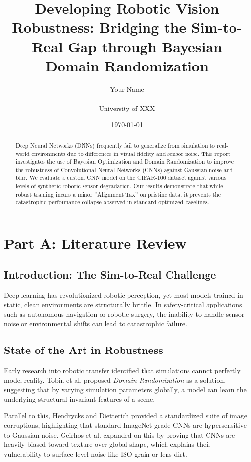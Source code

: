 \documentclass[11pt,a4paper]{article}
\title{Developing Robotic Vision Robustness: Bridging the Sim-to-Real Gap through Bayesian Domain Randomization}
\author{Your Name \\ [p12289lp] \\ University of XXX}
\date{\today}
\begin{document}
\maketitle

\begin{abstract}
Deep Neural Networks (DNNs) frequently fail to generalize from simulation to real-world environments due to differences in visual fidelity and sensor noise. This report investigates the use of Bayesian Optimization and Domain Randomization to improve the robustness of Convolutional Neural Networks (CNNs) against Gaussian noise and blur. We evaluate a custom CNN model on the CIFAR-100 dataset against various levels of synthetic robotic sensor degradation. Our results demonstrate that while robust training incurs a minor ``Alignment Tax'' on pristine data, it prevents the catastrophic performance collapse observed in standard optimized baselines.
\end{abstract}

\section{Part A: Literature Review}
\label{sec:lit_review}

\subsection{Introduction: The Sim-to-Real Challenge}
Deep learning has revolutionized robotic perception, yet most models trained in static, clean environments are structurally brittle. In safety-critical applications such as autonomous navigation or robotic surgery, the inability to handle sensor noise or environmental shifts can lead to catastrophic failure.

\subsection{State of the Art in Robustness}
Early research into robotic transfer identified that simulations cannot perfectly model reality. Tobin et al. \cite{tobin2017domain} proposed \textit{Domain Randomization} as a solution, suggesting that by varying simulation parameters globally, a model can learn the underlying structural invariant features of a scene.

Parallel to this, Hendrycks and Dietterich \cite{hendrycks2019benchmarking} provided a standardized suite of image corruptions, highlighting that standard ImageNet-grade CNNs are hypersensitive to Gaussian noise. Geirhos et al. \cite{geirhos2018imagenet} expanded on this by proving that CNNs are heavily biased toward texture over global shape, which explains their vulnerability to surface-level noise like ISO grain or lens dirt.
\end{document}
